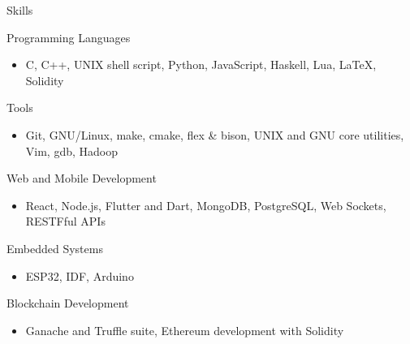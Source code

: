 \documentclass{article}
\newlength{\tabin}
\newlength{\secsep}
\newcommand{\lineunder}{\vspace*{-8pt} \\ \hspace*{-6pt} \hrulefill \\ \vspace*{-15pt}}
\newenvironment{tabbedsection}[1]{
	\begin{list}{}{
		\setlength{\itemsep}{0pt}
		\setlength{\labelsep}{0pt}
		\setlength{\labelwidth}{0pt}
		\setlength{\leftmargin}{\tabin}
		\setlength{\rightmargin}{\tabin}
		\setlength{\listparindent}{0pt}
		\setlength{\parsep}{0pt}
		\setlength{\parskip}{0pt}
		\setlength{\partopsep}{0pt}
		\setlength{\topsep}{#1}
	}
	\item[]
}{\end{list}}
\newenvironment{resume_section}[1]{
	\vspace{2\secsep}
	\textsc{\large#1}
	\lineunder
	\begin{tabbedsection}{\secsep}
}{\end{tabbedsection}}
\newenvironment{resume_subsection}[2][]{
	\textbf{#2} \hfill {\footnotesize #1} \hspace{2em}
	\begin{tabbedsection}{0.5\secsep}
}{\end{tabbedsection}}
\newenvironment{subitems}{
	\renewcommand{\labelitemi}{-}
	\begin{itemize}
		\setlength{\labelsep}{1em}
}{\end{itemize}}
\begin{document}
\begin{resume_section}{Skills}

	\begin{resume_subsection}{Programming Languages}
		\begin{subitems}
		\item C, C++, UNIX shell script, Python, JavaScript, Haskell, Lua, {\LaTeX}, Solidity
		\end{subitems}
	\end{resume_subsection}

	\begin{resume_subsection}{Tools}
		\begin{subitems}
		\item Git, GNU/Linux, make, cmake, flex \& bison, UNIX and GNU core utilities, Vim, gdb, Hadoop
		\end{subitems}
	\end{resume_subsection}

	\begin{resume_subsection}{Web and Mobile Development}
		\begin{subitems}
		\item React, Node.js, Flutter and Dart, MongoDB, PostgreSQL, Web Sockets, RESTFful APIs
		\end{subitems}
	\end{resume_subsection}

	\begin{resume_subsection}{Embedded Systems}
		\begin{subitems}
		\item ESP32, IDF, Arduino
		\end{subitems}
	\end{resume_subsection}

	\begin{resume_subsection}{Blockchain Development}
		\begin{subitems}
		\item Ganache and Truffle suite, Ethereum development with Solidity
		\end{subitems}
	\end{resume_subsection}

\end{resume_section}
\end{document}

